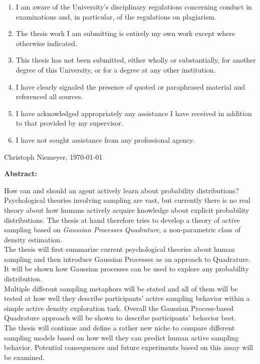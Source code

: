 \documentclass[oneside, 11pt]{book}
\begin{document}
\begin{enumerate}
\item I am aware of the University's disciplinary regulations concerning conduct in examinations and, in particular, of the regulations on plagiarism.
\item The thesis work I am submitting is entirely my own work except where otherwise indicated.
\item This thesis has not been submitted, either wholly or substantially, for another degree of this University, or for a degree at any other institution.
\item I have clearly signaled the presence of quoted or paraphrased material and referenced all sources.
\item I have acknowledged appropriately any assistance I have received in addition to that provided by my supervisor.
\item I have not sought assistance from any professional agency. 
\end{enumerate}
\vspace{2cm}
\begin{center}
Christoph Niemeyer, \today
\end{center}
\newpage
\begin{center}
\textbf{{\LARGE Abstract:}}\\
\end{center}
How can and should an agent actively learn about probability distributions? Psychological theories involving sampling are vast, but currently there is no real theory about how humans actively acquire knowledge about explicit probability distributions. The thesis at hand therefore tries to develop a theory of active sampling based on \emph{Gaussian Processes Quadrature}, a non-parametric class of density estimation.\\
The thesis will first summarize current psychological theories about human sampling and then introduce Gaussian Processes as an approach to Quadrature. It will be shown how Gaussian processes can be used to explore any probability distribution.\\
Multiple different sampling metaphors will be stated and all of them will be tested at how well they describe participants' active sampling behavior within a simple active density exploration task. Overall the Gaussian Process-based Quadrature approach will be shown to describe participants' behavior best.\\
The thesis will continue and define a rather new niche to compare different sampling models based on how well they can predict human active sampling behavior. Potential consequences and future experiments based on this assay will be examined.\\
\end{document}
